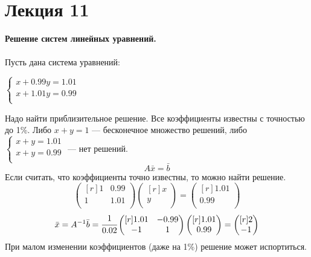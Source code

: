 \documentclass[12pt]{article}
\theoremstyle{definition}
\numberwithin{equation}{section}
\begin{document}
\section *{Лекция 11}
\noindent\textbf{Решение систем линейных уравнений.}\\ \\
Пусть дана система уравнений:\begin{center}
$
\left\{
\begin{array}{lcl}
    x+0.99y=1.01 \\
    x+1.01y=0.99 \\
\end{array}
\right.
$
\end{center}
Надо найти приблизительное решение. Все коэффициенты известны с точностью до 1\%.
Либо $x+y=1$ --- бесконечное множество решений, либо 
$
\left\{
\begin{array}{lcl}
    x+y=1.01 \\
    x+y=0.99 \\
\end{array}
\right.
$
--- нет решений.\\
$$A\bar x=\bar b$$
Если считать, что коэффициенты точно известны, то можно найти решение.
\[\begin{pmatrix}[r]
1 & 0.99 \\
1 & 1.01 \\
\end{pmatrix} \begin{pmatrix}[r]
x \\
y \\
\end{pmatrix} = \begin{pmatrix}[r]
1.01 \\
0.99 \\
\end{pmatrix}\]
\[\bar x= A^{-1} \bar b = \cfrac{1}{0.02} \begin{pmatrix}[r]
1.01 & -0.99 \\
-1 & 1 \\
\end{pmatrix} \begin{pmatrix}[r]
1.01 \\
0.99 \\
\end{pmatrix} = \begin{pmatrix}[r]
2 \\
-1 \\
\end{pmatrix}\]
При малом изменении коэффициентов (даже на 1\%) решение может испортиться.\\ \\
\end{document}
